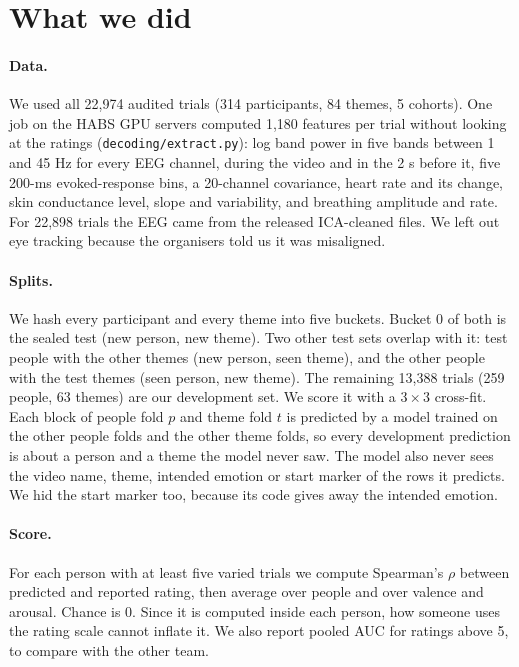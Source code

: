 \documentclass[10pt]{article}
\begin{document}
\section{What we did}

\paragraph{Data.} We used all 22,974 audited trials (314 participants, 84
themes, 5 cohorts). One job on the HABS GPU servers computed 1,180 features
per trial without looking at the ratings (\texttt{decoding/extract.py}): log
band power in five bands between 1 and 45 Hz for every EEG channel, during the
video and in the 2 s before it, five 200-ms evoked-response bins, a
20-channel covariance, heart rate and its change, skin conductance level,
slope and variability, and breathing amplitude and rate. For 22,898 trials
the EEG came from the released ICA-cleaned files. We left out eye tracking
because the organisers told us it was misaligned.

\paragraph{Splits.} We hash every participant and every theme into five
buckets. Bucket 0 of both is the sealed test (new person, new theme). Two
other test sets overlap with it: test people with the other themes (new
person, seen theme), and the other people with the test themes (seen person,
new theme). The remaining 13,388 trials (259 people, 63 themes) are our
development set. We score it with a $3\times3$ cross-fit. Each block of people
fold $p$ and theme fold $t$ is predicted by a model trained on the other people
folds and the other theme folds, so every development prediction is about a
person and a theme the model never saw. The model also never sees the video
name, theme, intended emotion or start marker of the rows it predicts. We hid
the start marker too, because its code gives away the intended emotion.

\paragraph{Score.} For each person with at least five varied trials we compute
Spearman's $\rho$ between predicted and reported rating, then average over
people and over valence and arousal. Chance is 0. Since it is computed inside
each person, how someone uses the rating scale cannot inflate it. We also
report pooled AUC for ratings above 5, to compare with the other team.
\end{document}
